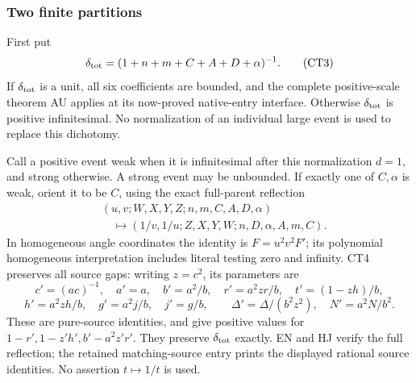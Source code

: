 \subsubsection*{Two finite partitions}

First put
\[
 \delta_{\rm tot}=(1+n+m+C+A+D+\alpha)^{-1}.
\tag{CT3}
\]
If \(\delta_{\rm tot}\) is a unit, all six coefficients are bounded,
and the complete positive-scale theorem AU applies at its now-proved
native-entry interface.  Otherwise \(\delta_{\rm tot}\) is positive
infinitesimal.  No normalization of an individual large event is
used to replace this dichotomy.

Call a positive event weak when it is infinitesimal after this
normalization \(d=1\), and strong otherwise.  A strong event may be
unbounded.  If exactly one of \(C,\alpha\) is weak, orient it to be
\(C\), using the exact full-parent reflection
\[
\begin{split}
 &(u,v;W,X,Y,Z;n,m,C,A,D,\alpha)\\
 &\quad\longmapsto
 (1/v,1/u;Z,X,Y,W;n,D,\alpha,A,m,C).
\end{split}\tag{CT4}
\]
In homogeneous angle coordinates the identity is
\(F=u^2v^2F'\); its polynomial homogeneous interpretation includes
literal testing zero and infinity.  CT4 preserves all source gaps:
writing \(z=c^2\), its parameters are
\[
 c'=(ac)^{-1},\quad a'=a,\quad b'=a^2/b,\quad
 r'=a^2zr/b,\quad t'=(1-zh)/b,
\]
\[
 h'=a^2zh/b,\quad g'=a^2j/b,\quad j'=g/b,\qquad
 \Delta'=\Delta/(b^2z^2),\quad N'=a^2N/b^2 .
\tag{CT5}
\]
These are pure-source identities, and give positive values for
\(1-r',1-z'h',b'-a^2z'r'\).  They preserve
\(\delta_{\rm tot}\) exactly.  EN and HJ verify the full reflection;
the retained matching-source entry prints the displayed rational
source identities.  No assertion \(t\mapsto1/t\) is used.

